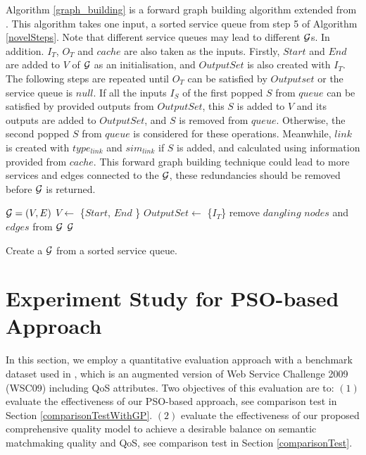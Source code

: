 Algorithm  \ref{graph_building} is a forward graph building algorithm extended from \cite{blum1997fast}. This algorithm takes one input, a sorted service queue from step 5 of Algorithm \ref{novelSteps}. Note that different service queues may lead to different $\gra$s. In addition. $I_{T}$, $O_{T}$ and $cache$ are also taken as the inputs. Firstly, $Start$ and $End$ are added to $V$ of $\gra$ as an initialisation, and $OutputSet$ is also created with $I_{T}$. The following steps are repeated until $O_{T}$ can be satisfied by $Outputset$ or the service queue is $null$. If all the inputs $I_{S}$ of the first popped  $S$ from $queue$ can be satisfied by provided outputs from $OutputSet$, this $S$ is added to $V$ and its outputs are added to $OutputSet$, and $S$ is removed from $queue$. Otherwise, the second popped  $S$ from $queue$ is considered for these operations. Meanwhile, $link$ is created with $type_{link}$ and $sim_{link}$ if $S$ is added, and calculated using information provided from $cache$. This forward graph building technique could lead to more services and edges connected to the $\gra$, these redundancies should be removed before $\gra$ is returned.

\begin{algorithm}
 \SetNlSty{}{}{:}
 \Output{$\gra$}
 $\mathcal{G} = (V, E)$\;
 $V \leftarrow$ \{$Start$, $End$ \}\;
 $OutputSet \leftarrow$ \{$I_{T}$\}\;
 remove $dangling$ $nodes$ and $edges$ from $\gra$\; 
 \KwRet $\gra$\;
 \caption{Create a $\gra$ from a sorted service queue.}
\label{graph_building}
\end{algorithm} 

\section{Experiment Study for PSO-based Approach}\label{experiment_design}
In this section, we employ a quantitative evaluation approach with a benchmark dataset used in \cite{ma2015hybrid,da2016genetic}, which is an augmented version of Web Service Challenge 2009 (WSC09) including QoS attributes. Two objectives of this evaluation are to: $(1)$ evaluate the effectiveness of our PSO-based approach, see comparison test in Section \ref{comparisonTestWithGP}. $(2)$ evaluate the effectiveness of our proposed comprehensive quality model to achieve a desirable balance on semantic matchmaking quality and QoS, see comparison test in Section \ref{comparisonTest}.

